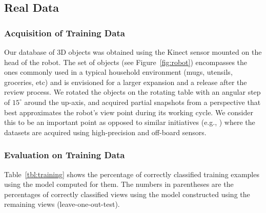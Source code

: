 \documentclass[conference]{sty/IEEEtran}
\begin{document}
\subsection{Real Data}
\label{sec:real_data}
\subsubsection{Acquisition of Training Data}
Our database of 3D objects was obtained using the Kinect sensor mounted on the head of the robot.
The set of objects (see Figure~\ref{fig:robot}) encompasses the ones commonly used
in a typical household environment (mugs, utensils, groceries, etc) and is envisioned for a
larger expansion and a release after the review process. We rotated the objects on the rotating table with
an angular step of $15^\circ$ around the up-axis, and acquired partial
snapshots from a perspective that best approximates the robot's view point during its working cycle.  We consider
this to be an important point as opposed to similar initiatives (e.g.,
\cite{kit}) where the datasets are acquired using high-precision and off-board sensors.




\subsubsection{Evaluation on Training Data}
Table~\ref{tbl:training} shows the percentage of correctly classified training examples using the model computed for them.
The numbers in parentheses are the percentages of correctly classified views using the model constructed using the remaining views
(leave-one-out-test).
\end{document}
